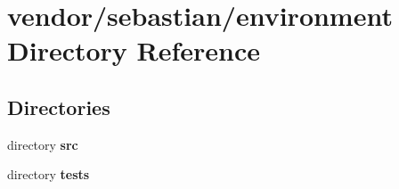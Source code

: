 \section{vendor/sebastian/environment Directory Reference}
\label{dir_03004f8a90a0cb93c6542b31bf3f268e}
\subsection*{Directories}
\begin{DoxyCompactItemize}
\item 
directory {\bf src}
\item 
directory {\bf tests}
\end{DoxyCompactItemize}
